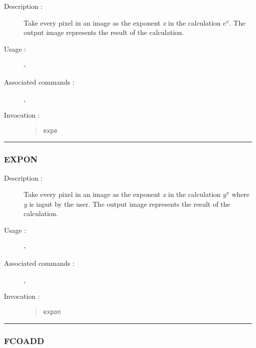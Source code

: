 \begin{description}

\item[Description :] Take every pixel in an image as the exponent {\it x} in
the calculation $e^{x}$.  The output image represents the result of the
calculation.

\item[Usage :] -

\item[Associated commands :] {\tt {}}, 
{\tt {}}

\item[Invocation :]

\begin{quote}{\tt  expe }\end{quote}

\end{description}

\hrule 
\subsubsection*{\label{EXPON}EXPON}

\begin{description}

\item[Description :] Take every pixel in an image as the exponent {\it x} in the
calculation $y^{x}$ where {\it y} is input by the user. The output image
represents the result of the calculation.

\item[Usage :] -

\item[Associated commands :] {\tt {}}, 
{\tt {}}

\item[Invocation :]

\begin{quote}{\tt  expon }\end{quote}

\end{description}

\hrule 
\subsubsection*{\label{FCOADD}FCOADD}

